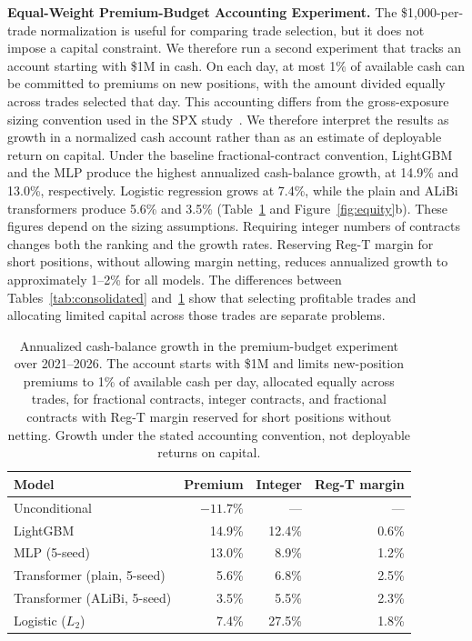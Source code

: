 \documentclass[sigconf]{acmart}
\begin{document}

\smallskip\noindent\textbf{Equal-Weight Premium-Budget Accounting Experiment.}
\label{sec:capitalscaled}
The \$1{,}000-per-trade normalization is useful for comparing trade selection, but it does not impose a capital constraint. We therefore run a second experiment that tracks an account starting with \$1M in cash. On each day, at most 1\% of available cash can be committed to premiums on new positions, with the amount divided equally across trades selected that day.
This accounting differs from the gross-exposure sizing convention used in the SPX study~\cite{glasserman2025tp2}. We therefore interpret the results as growth in a normalized cash account rather than as an estimate of deployable return on capital.
Under the baseline fractional-contract convention, LightGBM and the MLP produce the highest annualized cash-balance growth, at 14.9\% and 13.0\%, respectively. Logistic regression grows at 7.4\%, while the plain and ALiBi transformers produce 5.6\% and 3.5\% (Table~\ref{tab:capitalscaled} and Figure~\ref{fig:equity}b).
These figures depend on the sizing assumptions. Requiring integer numbers of contracts changes both the ranking and the growth rates. Reserving Reg-T margin for short positions, without allowing margin netting, reduces annualized growth to approximately 1--2\% for all models. The differences between Tables~\ref{tab:consolidated} and~\ref{tab:capitalscaled} show that selecting profitable trades and allocating limited capital across those trades are separate problems.

\begin{table}[tb]
\centering
\footnotesize
\begin{tabular}{lrrr}
\toprule
Model & Premium & Integer & Reg-T margin \\
\midrule
Unconditional & $-11.7\%$ & --- & --- \\
LightGBM & 14.9\% & 12.4\% & 0.6\% \\
MLP (5-seed) & 13.0\% & 8.9\% & 1.2\% \\
Transformer (plain, 5-seed) & 5.6\% & 6.8\% & 2.5\% \\
Transformer (ALiBi, 5-seed) & 3.5\% & 5.5\% & 2.3\% \\
Logistic ($L_2$) & 7.4\% & 27.5\% & 1.8\% \\
\bottomrule
\end{tabular}
\caption{Annualized cash-balance growth in the premium-budget experiment over 2021--2026. The account starts with \$1M and limits new-position premiums to 1\% of available cash per day, allocated equally across trades, for fractional contracts, integer contracts, and fractional contracts with Reg-T margin reserved for short positions without netting. Growth under the stated accounting convention, not deployable returns on capital.}
\label{tab:capitalscaled}
\end{table}
\end{document}
